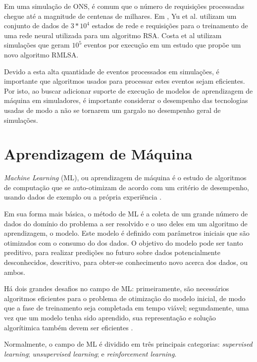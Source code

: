 Em uma simulação de ONS, é comum que o número de requisições processadas chegue até a magnitude de centenas de milhares. Em \cite{eon_ml_rsa_dl_2019}, Yu et al. utilizam um conjunto de dados de $3 * 10^4$ estados de rede e requisições para o treinamento de uma rede neural utilizada para um algoritmo RSA. Costa et al  \cite{rmlsaacosta2020} utilizam simulações que geram $10^5$ eventos por execução em um estudo que propõe um novo algoritmo RMLSA.

Devido a esta alta quantidade de eventos processados em simulações, é importante que algoritmos usados para processar estes eventos sejam eficientes. Por isto, ao buscar adicionar suporte de execução de modelos de aprendizagem de máquina em simuladores, é importante considerar o desempenho das tecnologias usadas de modo a não se tornarem um gargalo no desempenho geral de simulações.

\section{Aprendizagem de Máquina}
\label{ml}

\textit{Machine Learning} (ML), ou aprendizagem de máquina é o estudo de algoritmos de computação que se auto-otimizam de acordo com um critério de desempenho, usando dados de exemplo ou a própria experiência \cite{mitchell1997ml, alpaydin2020introduction}.

Em sua forma mais básica, o método de ML é a coleta de um grande número de dados do domínio do problema a ser resolvido e o uso deles em um algoritmo de aprendizagem, o modelo. Este modelo é definido com parâmetros iniciais que são otimizados com o consumo do dos dados. O objetivo do modelo pode ser tanto preditivo, para realizar predições no futuro sobre dados potencialmente desconhecidos, descritivo, para obter-se conhecimento novo acerca dos dados, ou ambos.

Há dois grandes desafios no campo de ML: primeiramente, são necessários algoritmos eficientes para o problema de otimização do modelo inicial, de modo que a fase de treinamento seja completada em tempo viável; segundamente, uma vez que um modelo tenha sido aprendido, sua representação e solução algorítimica também devem ser eficientes \cite{alpaydin2020introduction, brief_introduction_to_ml}.

Normalmente, o campo de ML é dividido em três principais categorias: \textit{supervised learning}; \textit{unsupervised learning}; e \textit{reinforcement learning}.

